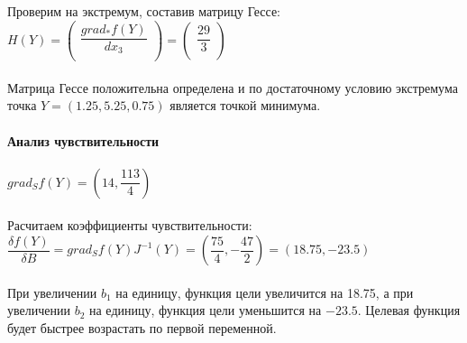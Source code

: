 \documentclass[14pt,a4paper,fleqn]{extarticle}
\begin{document}
	Проверим на экстремум, составив матрицу Гессе:\\
	$H(Y) = \begin{pmatrix}
		\dfrac{grad_*f(Y)}{dx_3}\\
	\end{pmatrix} = 
	\begin{pmatrix}
		\dfrac{29}{3}\\
	\end{pmatrix}$\\\\
	Матрица Гессе положительна определена и по достаточному условию экстремума точка $Y = (1.25, 5.25, 0.75)$ является точкой минимума.\\\\
	\textbf{Анализ чувствительности}\\\\
	$grad_S f(Y) = (14, \dfrac{113}{4})$\\\\
	Расчитаем коэффициенты чувствительности:\\
	$\dfrac{\delta f(Y)}{\delta B} = grad_S f(Y)J^{-1}(Y) = (\dfrac{75}{4}, -\dfrac{47}{2}) = (18.75, -23.5)$\\\\
	При увеличении $b_1$ на единицу, функция цели увеличится на 18.75, а при увеличении $b_2$ на единицу, функция цели уменьшится на $-23.5$. Целевая функция будет быстрее возрастать по первой переменной.
\end{document}
